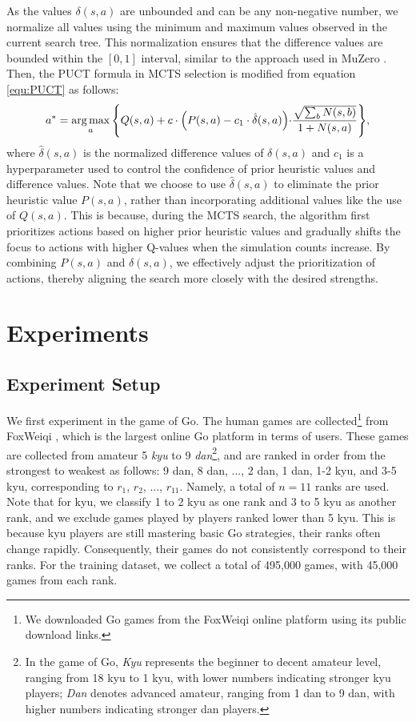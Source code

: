 As the values $\delta(s,a)$ are unbounded and can be any non-negative number, we normalize all values using the minimum and maximum values observed in the current search tree.
This normalization ensures that the difference values are bounded within the $[0, 1]$ interval, similar to the approach used in MuZero \citep{schrittwieser_mastering_2020}.
Then, the PUCT formula in MCTS selection is modified from equation \ref{equ:PUCT} as follows:
\begin{equation}
\label{equ:SE-PUCT}
    {a^*} = \mathop{\arg\max}_{a} \Bigg\{Q(s,a)+c\cdot\Bigl(P(s,a)-c_1\cdot\hat{\delta}(s,a)\Bigl)\cdot\frac {\sqrt{\sum_{b}{N(s,b)}}}{1+N(s,a)}\Bigg\},
\end{equation}
where $\hat{\delta}(s,a)$ is the normalized difference values of $\delta(s,a)$ and $c_1$ is a hyperparameter used to control the confidence of prior heuristic values and difference values.
Note that we choose to use $\hat{\delta}(s,a)$ to eliminate the prior heuristic value $P(s,a)$, rather than incorporating additional values like the use of $Q(s,a)$.
This is because, during the MCTS search, the algorithm first prioritizes actions based on higher prior heuristic values and gradually shifts the focus to actions with higher Q-values when the simulation counts increase.
By combining $P(s,a)$ and $\hat{\delta}(s,a)$, we effectively adjust the prioritization of actions, thereby aligning the search more closely with the desired strengths.


\section{Experiments}
\label{sec:experiments}

\subsection{Experiment Setup}
\label{subsec:exp_setups}
We first experiment in the game of Go.
The human games are collected\footnote{We downloaded Go games from the FoxWeiqi online platform using its public download links.} from FoxWeiqi \citep{fox_weiqi_2024}, which is the largest online Go platform in terms of users.
These games are collected from amateur 5 \textit{kyu} to 9 \textit{dan}\footnote{In the game of Go, \textit{Kyu} represents the beginner to decent amateur level, ranging from 18 kyu to 1 kyu, with lower numbers indicating stronger kyu players; \textit{Dan} denotes advanced amateur, ranging from 1 dan to 9 dan, with higher numbers indicating stronger dan players.}, and are ranked in order from the strongest to weakest as follows: 9 dan, 8 dan, ..., 2 dan, 1 dan, 1-2 kyu, and 3-5 kyu, corresponding to $r_1$, $r_2$, ..., $r_{11}$.
Namely, a total of $n=11$ ranks are used.
Note that for kyu, we classify 1 to 2 kyu as one rank and 3 to 5 kyu as another rank, and we exclude games played by players ranked lower than 5 kyu.
This is because kyu players are still mastering basic Go strategies, their ranks often change rapidly.
Consequently, their games do not consistently correspond to their ranks.
For the training dataset, we collect a total of 495,000 games, with 45,000 games from each rank.

